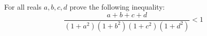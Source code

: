 For all reals $a, b, c,d $ prove the following inequality:
$$\frac{a + b + c + d}{(1 + a^2)(1 + b^2)(1 + c^2)(1 + d^2)}< 1$$